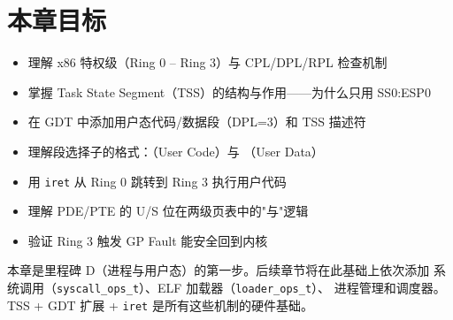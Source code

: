 \section{本章目标}

\begin{itemize}
  \item 理解 x86 特权级（Ring 0 -- Ring 3）与 CPL/DPL/RPL 检查机制
  \item 掌握 Task State Segment（TSS）的结构与作用——为什么只用 SS0:ESP0
  \item 在 GDT 中添加用户态代码/数据段（DPL=3）和 TSS 描述符
  \item 理解段选择子的格式：（User Code）与 （User Data）
  \item 用 \texttt{iret} 从 Ring 0 跳转到 Ring 3 执行用户代码
  \item 理解 PDE/PTE 的 U/S 位在两级页表中的"与"逻辑
  \item 验证 Ring 3 触发 GP Fault 能安全回到内核
\end{itemize}

\begin{designbox}
本章是里程碑 D（进程与用户态）的第一步。后续章节将在此基础上依次添加
系统调用（\texttt{syscall\_ops\_t}）、ELF 加载器（\texttt{loader\_ops\_t}）、
进程管理和调度器。TSS + GDT 扩展 + \texttt{iret} 是所有这些机制的硬件基础。
\end{designbox}
